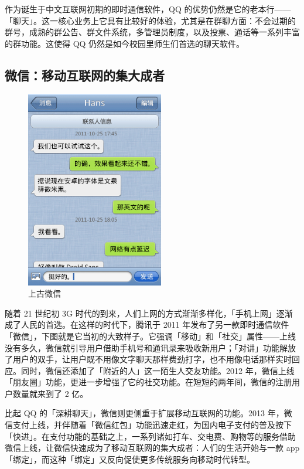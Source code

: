 作为诞生于中文互联网初期的即时通信软件，QQ 的优势仍然是它的老本行——「聊天」。这一核心业务上它具有比较好的体验，尤其是在群聊方面：不会过期的群号，成熟的群公告、群文件系统，多管理员制度，以及投票、通话等一系列丰富的群功能。这使得 QQ 仍然是如今校园里师生们首选的聊天软件。

\subsection{微信：移动互联网的集大成者}

\begin{figure}
  \centering
  \vspace*{-1.5ex}
  \includegraphics[width=6cm]{assets/software/Old_Wechat.png}
  \caption{上古微信}
  \label{fig:Old_Wechat}
\end{figure}

随着 21 世纪初 3G 时代的到来，人们上网的方式渐渐多样化，「手机上网」逐渐成了人民的首选。在这样的时代下，腾讯于 2011 年发布了另一款即时通信软件「微信」，下图就是它当初的大致样子。它强调「移动」和「社交」属性——上线没有多久，微信就引导用户借助手机号和通讯录来吸收新用户；「对讲」功能解放了用户的双手，让用户既不用像文字聊天那样费劲打字，也不用像电话那样实时回应。同时，微信还添加了「附近的人」这一陌生人交友功能。2012 年，微信上线「朋友圈」功能，更进一步增强了它的社交功能。在短短的两年间，微信的注册用户数量就来到了 2 亿。

比起 QQ 的「深耕聊天」，微信则更侧重于扩展移动互联网的功能。2013 年，微信支付上线，并伴随着「微信红包」功能迅速走红，为国内电子支付的普及按下「快进」。在支付功能的基础之上，一系列诸如打车、交电费、购物等的服务借助微信上线，让微信快速成为了移动互联网的集大成者：人们的生活开始与一款 app「绑定」，而这种「绑定」又反向促使更多传统服务向移动时代转型。

